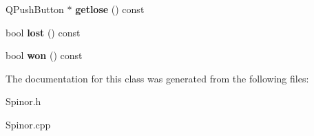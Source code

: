 \begin{DoxyCompactItemize}
\item 
Q\+Push\+Button $\ast$ {\bfseries getlose} () const \hypertarget{class_spinor_a55065887807a2dd0839421cce0358546}{}\label{class_spinor_a55065887807a2dd0839421cce0358546}

\item 
bool {\bfseries lost} () const \hypertarget{class_spinor_a4b524e411ecf137b2991eecb1d927d26}{}\label{class_spinor_a4b524e411ecf137b2991eecb1d927d26}

\item 
bool {\bfseries won} () const \hypertarget{class_spinor_aa3d89dc20f4dc1fdde62ce578cde2756}{}\label{class_spinor_aa3d89dc20f4dc1fdde62ce578cde2756}

\end{DoxyCompactItemize}


The documentation for this class was generated from the following files\+:\begin{DoxyCompactItemize}
\item 
Spinor.\+h\item 
Spinor.\+cpp\end{DoxyCompactItemize}
